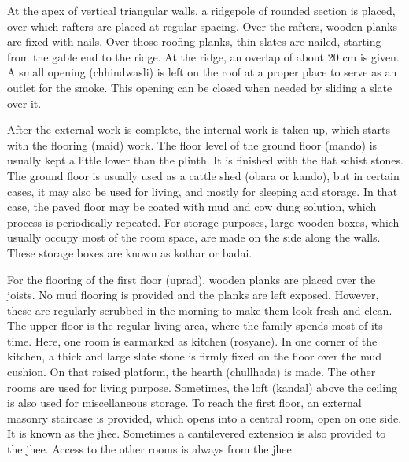 At the apex of vertical triangular walls, a ridgepole of rounded section is placed, over which rafters are placed at regular spacing. Over the rafters, wooden planks are fixed with nails. Over those roofing planks, thin slates are nailed, starting from the gable end to the ridge. At the ridge, an overlap of about 20 cm is given. A small opening (chhindwasli) is left on the roof at a proper place to serve as an outlet for the smoke. This opening can be closed when needed by sliding a slate over it.

After the external work is complete, the internal work is taken up, which starts with the flooring (maid) work. The floor level of the ground floor (mando) is usually kept a little lower than the plinth. It is finished with the flat schist stones. The ground floor is usually used as a cattle shed (obara or kando), but in certain cases, it may also be used for living, and mostly for sleeping and storage. In that case, the paved floor may be coated with mud and cow dung solution, which process is periodically repeated. For storage purposes, large wooden boxes, which usually occupy most of the room space, are made on the side along the walls. These storage boxes are known as kothar or badai.

For the flooring of the first floor (uprad), wooden planks are placed over the joists. No mud flooring is provided and the planks are left exposed. However, these are regularly scrubbed in the morning to make them look fresh and clean. The upper floor is the regular living area, where the family spends most of its time. Here, one room is earmarked as kitchen (rosyane). In one corner of the kitchen, a thick and large slate stone is firmly fixed on the floor over the mud cushion. On that raised platform, the hearth (chullhada) is made. The other rooms are used for living purpose. Sometimes, the loft (kandal) above the ceiling is also used for miscellaneous storage. To reach the first floor, an external masonry staircase is provided, which opens into a central room, open on one side. It is known as the jhee. Sometimes a cantilevered extension is also provided to the jhee. Access to the other rooms is always from the jhee.

